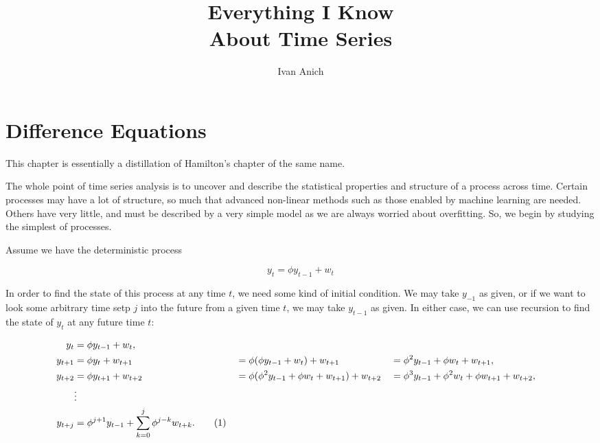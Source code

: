 \documentclass{tufte-book}
\title{Everything I Know \\About Time Series}
\author{Ivan Anich}
\begin{document}
\maketitle

\tableofcontents

\chapter{Difference Equations}

This chapter is essentially a distillation of Hamilton's \cite{hamilton1994time} chapter of the same name.

The whole point of time series analysis is to uncover and describe the statistical properties and structure of a process across time. Certain processes may have a lot of structure, so much that advanced non-linear methods such as those enabled by machine learning are needed. Others have very little, and must be described by a very simple model as we are always worried about overfitting. So, we begin by studying the simplest of processes.

Assume we have the deterministic process

\begin{equation}
    y_t = \phi y_{t-1} + w_t \label{eq: first-order-deq}
\end{equation}

In order to find the state of this process at any time $t$, we need some kind of initial condition. We may take $y_{-1}$ as given, or if we want to look some arbitrary time setp $j$ into the future from a given time $t$, we may take $y_{t-1}$ as given. In either case, we can use recursion to find the state of $y_t$ at any future time $t$:

\begin{align*}
    y_t     &= \phi y_{t-1} + w_t, \\
    y_{t+1} &= \phi y_{t} + w_{t+1}     &&= \phi (\phi y_{t-1} + w_t) + w_{t+1}                     &&= \phi^2 y_{t-1} + \phi w_t + w_{t+1}, \\
    y_{t+2} &= \phi y_{t+1} + w_{t+2}   &&= \phi (\phi^2 y_{t-1} + \phi w_t + w_{t+1}) + w_{t+2}    &&= \phi^3 y_{t-1} + \phi^2 w_t + \phi w_{t+1} + w_{t+2}, \\
            &\vdots \\
    y_{t+j} &= \phi^{j+1} y_{t-1} + \sum_{k=0}^j \phi^{j-k} w_{t+k}. \refstepcounter{equation} \tag{\theequation} \label{eq:first-order-j-horizon}
\end{align*}
\end{document}
